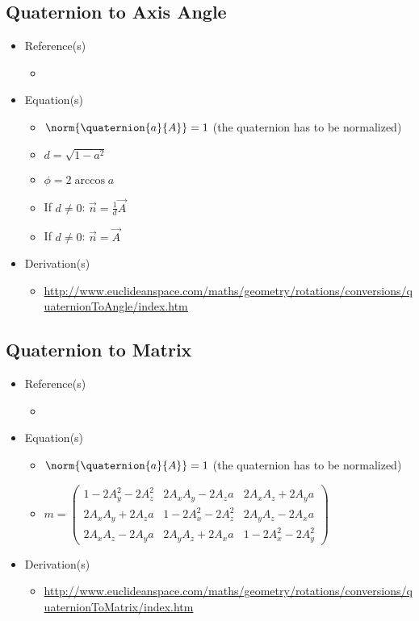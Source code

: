 \documentclass[letterpaper]{article}
\begin{document}
	\subsection{Quaternion to Axis Angle}
	\begin{itemize}
		\item Reference(s)
			\begin{itemize}
				\item \cite{Baker2008}
			\end{itemize}
		\item Equation(s)
			\begin{itemize}
				\item $\norm{\quaternion{a}{A}} = 1$ (the quaternion has to be normalized)
				\item $d = \sqrt{1 - a^2}$
				\item $\phi = 2\arccos{a}$
				\item If $d \neq 0$: $\vec{n} = \frac{1}{d}\vec{A}$
				\item If $d \neq 0$: $\vec{n} = \vec{A}$
			\end{itemize}
		\item Derivation(s)
			\begin{itemize}
				\item \url{http://www.euclideanspace.com/maths/geometry/rotations/conversions/quaternionToAngle/index.htm}
			\end{itemize}
	\end{itemize}
	
	\subsection{Quaternion to Matrix}
	\label{sec:quaternionmatrix}
	\begin{itemize}
		\item Reference(s)
			\begin{itemize}
				\item \cite{Baker2008}
			\end{itemize}
		\item Equation(s)
			\begin{itemize}
				\item $\norm{\quaternion{a}{A}} = 1$ (the quaternion has to be normalized)
				\item $m = \left(\begin{array}{ccc}
												 1 - 2A_y^2 - 2A_z^2		& 2A_xA_y - 2A_za 		& 2A_xA_z + 2A_ya 		\\
												 2A_xA_y + 2A_za 				& 1 - 2A_x^2 - 2A_z^2 & 2A_yA_z - 2A_xa 		\\
												 2A_xA_z - 2A_ya 				& 2A_yA_z + 2A_xa 		& 1 - 2A_x^2 - 2A_y^2 
												\end{array} \right)$
			\end{itemize}
		\item Derivation(s)
			\begin{itemize}
				\item \url{http://www.euclideanspace.com/maths/geometry/rotations/conversions/quaternionToMatrix/index.htm}
			\end{itemize}
	\end{itemize}
	
\end{document}
